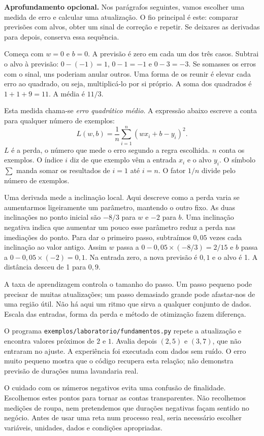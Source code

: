 \textbf{Aprofundamento opcional.} Nos parágrafos seguintes, vamos escolher uma medida de erro e calcular uma atualização. O fio principal é este: comparar previsões com alvos, obter um sinal de correção e repetir. Se deixares as derivadas para depois, conserva essa sequência.

Começa com $w=0$ e $b=0$. A previsão é zero em cada um dos três casos. Subtrai o alvo à previsão: $0-(-1)=1$, $0-1=-1$ e $0-3=-3$. Se somasses os erros com o sinal, uns poderiam anular outros. Uma forma de os reunir é elevar cada erro ao quadrado, ou seja, multiplicá-lo por si próprio. A soma dos quadrados é $1+1+9=11$. A média é $11/3$.

Esta medida chama-se \emph{erro quadrático médio}. A expressão abaixo escreve a conta para qualquer número de exemplos:
\[
L(w,b)=\frac1n\sum_{i=1}^{n}(wx_i+b-y_i)^2.
\]
$L$ é a perda, o número que mede o erro segundo a regra escolhida. $n$ conta os exemplos. O índice $i$ diz de que exemplo vêm a entrada $x_i$ e o alvo $y_i$. O símbolo $\sum$ manda somar os resultados de $i=1$ até $i=n$. O fator $1/n$ divide pelo número de exemplos.

Uma derivada mede a inclinação local. Aqui descreve como a perda varia se aumentarmos ligeiramente um parâmetro, mantendo o outro fixo. As duas inclinações no ponto inicial são $-8/3$ para $w$ e $-2$ para $b$. Uma inclinação negativa indica que aumentar um pouco esse parâmetro reduz a perda nas imediações do ponto. Para dar o primeiro passo, subtraímos $0{,}05$ vezes cada inclinação ao valor antigo. Assim $w$ passa a $0-0{,}05\times(-8/3)=2/15$ e $b$ passa a $0-0{,}05\times(-2)=0{,}1$. Na entrada zero, a nova previsão é $0{,}1$ e o alvo é 1. A distância desceu de 1 para $0{,}9$.

A taxa de aprendizagem controla o tamanho do passo. Um passo pequeno pode precisar de muitas atualizações; um passo demasiado grande pode afastar-nos de uma região útil. Não há aqui um ritmo que sirva a qualquer conjunto de dados. Escala das entradas, forma da perda e método de otimização fazem diferença.

O programa \texttt{exemplos/laboratorio/fundamentos.py} repete a atualização e encontra valores próximos de $2$ e $1$. Avalia depois $(2,5)$ e $(3,7)$, que não entraram no ajuste. A experiência foi executada com dados sem ruído. O erro muito pequeno mostra que o código recupera esta relação; não demonstra previsão de durações numa lavandaria real.

O cuidado com os números negativos evita uma confusão de finalidade. Escolhemos estes pontos para tornar as contas transparentes. Não recolhemos medições de roupa, nem pretendemos que durações negativas façam sentido no negócio. Antes de usar uma reta num processo real, seria necessário escolher variáveis, unidades, dados e condições apropriadas.

